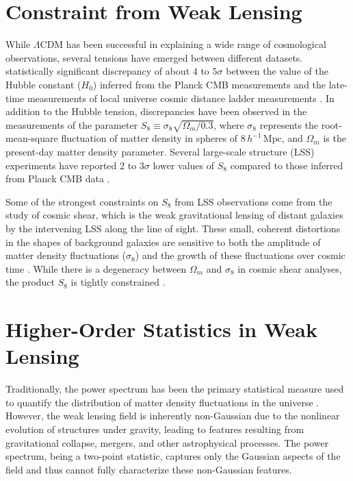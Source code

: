 \section{Constraint from Weak Lensing}
While $\Lambda$CDM has been successful in explaining a wide range of cosmological observations, several tensions have emerged between different datasets. statistically significant discrepancy of about $4$ to $5\sigma$ between the value of the Hubble constant ($H_0$) inferred from the Planck CMB measurements \citep{2021CQGra..38o3001D} and the late-time measurements of local universe cosmic distance ladder measurements \citep{2022ApJ...934L...7R}. In addition to the Hubble tension, discrepancies have been observed in the measurements of the parameter $S_8 \equiv \sigma_8 \sqrt{\Omega_m/0.3}$, where $\sigma_8$ represents the root-mean-square fluctuation of matter density in spheres of $8\, h^{-1}\,\mathrm{Mpc}$, and $\Omega_m$ is the present-day matter density parameter. Several large-scale structure (LSS) experiments have reported $2$ to $3\sigma$ lower values of $S_8$ compared to those inferred from Planck CMB data \citep{2019PASJ...71...43H, 2021A&A...645A.104A, 2021JCAP...10..030G}.

Some of the strongest constraints on $S_8$ from LSS observations come from the study of cosmic shear, which is the weak gravitational lensing of distant galaxies by the intervening LSS along the line of sight. 
These small, coherent distortions in the shapes of background galaxies are sensitive to both the amplitude of matter density fluctuations ($\sigma_8$) and the growth of these fluctuations over cosmic time \citep{2001PhR...340..291B, 2010CQGra..27w3001B, 2015RPPh...78h6901K}. While there is a degeneracy between $\Omega_m$ and $\sigma_8$ in cosmic shear analyses, the product $S_8$ is tightly constrained \citep{2015RPPh...78h6901K, 2018ARA&A..56..393M}.


\section{Higher-Order Statistics in Weak Lensing}
Traditionally, the power spectrum has been the primary statistical measure used to quantify the distribution of matter density fluctuations in the universe \citep{2019PASJ...71...43H, 2023PhRvD.108l3519D}. However, the weak lensing field is inherently non-Gaussian due to the nonlinear evolution of structures under gravity, leading to features resulting from gravitational collapse, mergers, and other astrophysical processes. The power spectrum, being a two-point statistic, captures only the Gaussian aspects of the field and thus cannot fully characterize these non-Gaussian features.

